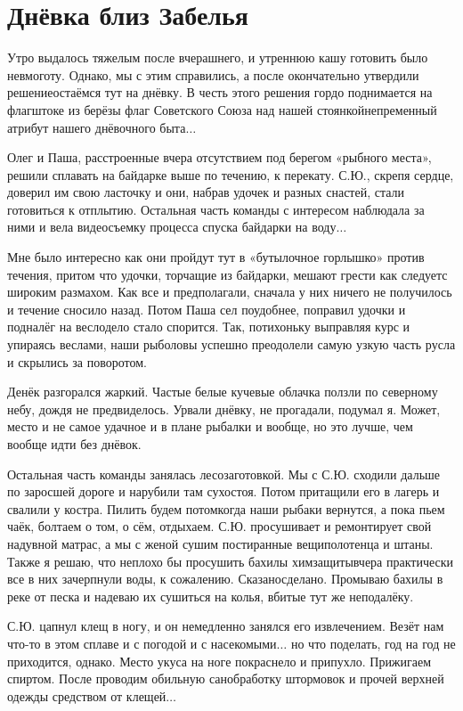 \chapter{Днёвка близ Забелья} 

Утро выдалось тяжелым после вчерашнего, и утреннюю кашу готовить было невмоготу. Однако, мы с этим справились, а после окончательно утвердили решение\mdash остаёмся тут на днёвку. В честь этого решения гордо поднимается на флагштоке из берёзы флаг Советского Союза над нашей стоянкой\mdash непременный атрибут нашего днёвочного быта$\ldots$ 

Олег и Паша, расстроенные вчера отсутствием под берегом «рыбного места», решили сплавать на байдарке выше по течению, к перекату. С.Ю., скрепя сердце, доверил им свою ласточку и они, набрав удочек и разных снастей, стали готовиться к отплытию. Остальная часть команды с интересом наблюдала за ними и вела видеосъемку процесса спуска байдарки на воду$\ldots$
 
Мне было интересно как они пройдут тут в «бутылочное горлышко» против течения, притом что удочки, торчащие из байдарки, мешают грести как следует\mdash с широким размахом. Как все и предполагали, сначала у них ничего не получилось и течение сносило назад. Потом Паша сел поудобнее, поправил удочки и подналёг на весло\mdash дело стало спорится. Так, потихоньку выправляя курс и упираясь веслами, наши рыболовы успешно преодолели самую узкую часть русла и скрылись за поворотом.

Денёк разгорался жаркий. Частые белые кучевые облачка ползли по северному небу, дождя не предвиделось. Урвали днёвку, не прогадали, подумал я. Может, место и не самое удачное и в плане рыбалки и вообще, но это лучше, чем вообще идти без днёвок.

Остальная часть команды занялась лесозаготовкой. Мы с С.Ю. сходили дальше по заросшей дороге и нарубили там сухостоя. Потом притащили его в лагерь и свалили у костра. Пилить будем потом\mdash когда наши рыбаки вернутся, а пока пьем чаёк, болтаем о том, о сём, отдыхаем. С.Ю. просушивает и ремонтирует свой надувной матрас, а мы с женой сушим постиранные вещи\mdash полотенца и штаны. Также я решаю, что неплохо бы просушить бахилы химзащиты\mdash вчера практически все в них зачерпнули воды, к сожалению. Сказано\mdash сделано. Промываю бахилы в реке от песка и надеваю их сушиться на колья, вбитые тут же неподалёку. 

С.Ю. цапнул клещ в ногу, и он немедленно занялся его извлечением. Везёт нам что-то в этом сплаве и с погодой и с насекомыми$\ldots$ но что поделать, год на год не приходится, однако. Место укуса на ноге покраснело и припухло. Прижигаем спиртом. После проводим обильную санобработку штормовок и прочей верхней одежды средством от клещей$\ldots$
 
